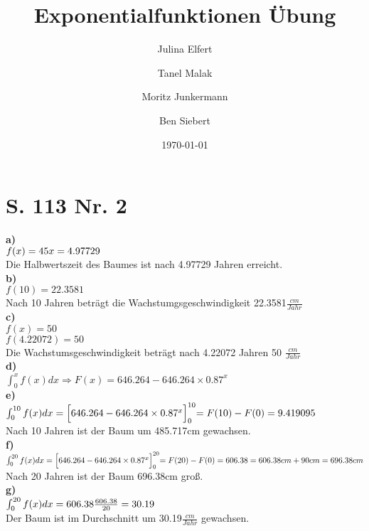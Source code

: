 \documentclass[12pt, a4paper]{report}
\begin{document}
	\title{Exponentialfunktionen Übung}
	\date{\today}
	\author{Julina Elfert \and Tanel Malak \and Moritz Junkermann \and Ben Siebert}
	\maketitle
	\tableofcontents
	\bsremovechaptertitle
	\chapter{S. 113 Nr. 2}
	\textbf{a)} \\
	$f(x) = 45 \\
	x = 4.97729$
	\\
	Die Halbwertszeit des Baumes ist nach 4.97729 Jahren erreicht. \\
	\textbf{b)} \\
	$f(10) = 22.3581$ \\
	Nach 10 Jahren beträgt die Wachstumgsgeschwindigkeit 22.3581$\frac{cm}{Jahr}$
	\\
	\textbf{c)} \\
	$f(x) = 50$ \\
	$f(4.22072) = 50$ \\
	Die Wachstumsgeschwindigkeit beträgt nach 4.22072 Jahren 50 $\frac{cm}{Jahr}$
	\\
	\textbf{d)} \\
	$\int_{0}^{x}f(x) dx \Rightarrow F(x) = 646.264 - 646.264 \times 0.87^x$ \\
	\textbf{e)} \\
	$
	\int_{0}^{10} f(x) dx = \Bigl[646.264 - 646.264 \times 0.87^x\Bigl]_{0}^{10} = F(10) - F(0) = 9.419095
	$ \\
	Nach 10 Jahren ist der Baum um 485.717cm gewachsen. \\
	\textbf{f)} \\
	$
	\int_{0}^{20} f(x) dx = \Bigl[646.264 - 646.264 \times 0.87^x\Bigl]_{0}^{20} = F(20) - F(0) = 606.38 \\
	 = 606.38cm + 90cm = 696.38cm
	$ \\
	Nach 20 Jahren ist der Baum 696.38cm groß. \\
	\textbf{g)} \\
	$
	\int_{0}^{20} f(x) dx = 606.38 \\
	\frac{606.38}{20} = 30.19
	$ \\
	Der Baum ist im Durchschnitt um 30.19$\frac{cm}{Jahr}$ gewachsen.
\end{document}
